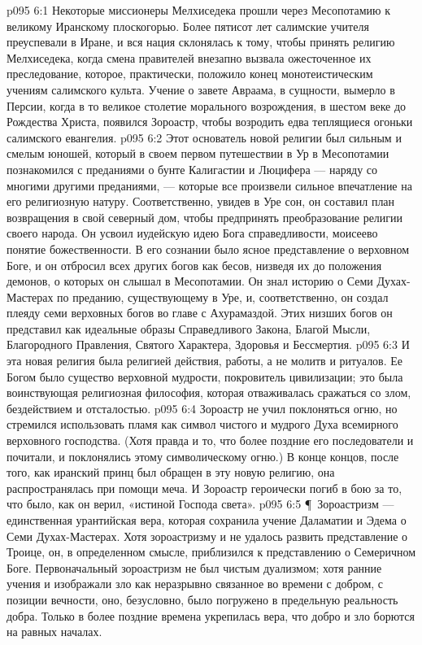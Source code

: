 \vs p095 6:1 Некоторые миссионеры Мелхиседека прошли через Месопотамию к великому Иранскому плоскогорью. Более пятисот лет салимские учителя преуспевали в Иране, и вся нация склонялась к тому, чтобы принять религию Мелхиседека, когда смена правителей внезапно вызвала ожесточенное их преследование, которое, практически, положило конец монотеистическим учениям салимского культа. Учение о завете Авраама, в сущности, вымерло в Персии, когда в то великое столетие морального возрождения, в шестом веке до Рождества Христа, появился Зороастр, чтобы возродить едва теплящиеся огоньки салимского евангелия.
\vs p095 6:2 Этот основатель новой религии был сильным и смелым юношей, который в своем первом путешествии в Ур в Месопотамии познакомился с преданиями о бунте Калигастии и Люцифера --- наряду со многими другими преданиями, --- которые все произвели сильное впечатление на его религиозную натуру. Соответственно, увидев в Уре сон, он составил план возвращения в свой северный дом, чтобы предпринять преобразование религии своего народа. Он усвоил иудейскую идею Бога справедливости, моисеево понятие божественности. В его сознании было ясное представление о верховном Боге, и он отбросил всех других богов как бесов, низведя их до положения демонов, о которых он слышал в Месопотамии. Он знал историю о Семи Духах\hyp{}Мастерах по преданию, существующему в Уре, и, соответственно, он создал плеяду семи верховных богов во главе с Ахурамаздой. Этих низших богов он представил как идеальные образы Справедливого Закона, Благой Мысли, Благородного Правления, Святого Характера, Здоровья и Бессмертия.
\vs p095 6:3 И эта новая религия была религией действия, работы, а не молитв и ритуалов. Ее Богом было существо верховной мудрости, покровитель цивилизации; это была воинствующая религиозная философия, которая отваживалась сражаться со злом, бездействием и отсталостью.
\vs p095 6:4 Зороастр не учил поклоняться огню, но стремился использовать пламя как символ чистого и мудрого Духа всемирного верховного господства. (Хотя правда и то, что более поздние его последователи и почитали, и поклонялись этому символическому огню.) В конце концов, после того, как иранский принц был обращен в эту новую религию, она распространялась при помощи меча. И Зороастр героически погиб в бою за то, что было, как он верил, «истиной Господа света».
\vs p095 6:5 \P\ Зороастризм --- единственная урантийская вера, которая сохранила учение Даламатии и Эдема о Семи Духах\hyp{}Мастерах. Хотя зороастризму и не удалось развить представление о Троице, он, в определенном смысле, приблизился к представлению о Семеричном Боге. Первоначальный зороастризм не был чистым дуализмом; хотя ранние учения и изображали зло как неразрывно связанное во времени с добром, с позиции вечности, оно, безусловно, было погружено в предельную реальность добра. Только в более поздние времена укрепилась вера, что добро и зло борются на равных началах.
